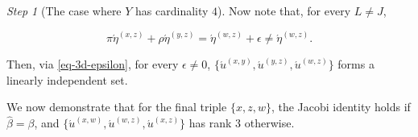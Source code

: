 \documentclass[ecta,nameyear,draft]{econsocart}
\newcommand{\xy}{{(x, y)}}
\newcommand{\yz}{{(y,z)}}
\newcommand{\xz}{{(x,z)}}
\newcommand{\xw}{{(x,w)}}
\newcommand{\wz}{(w,z)}
\theoremstyle{plain}
\theoremstyle{remark}
\newtheorem{step}{Step}[section]
\begin{document}
\begin{appendix}
\begin{step}[The case where $Y$ has cardinality $4$]
    Now note that, for every $L \neq J$,
    \begin{linenomath*}
      \begin{equation}\label{eq-3d-epsilon}
        \pi \acute{\eta}^{\xz} + \rho \acute{\eta}^{\yz} = \acute{\eta}^{\wz} +
        \epsilon \neq \acute{\eta}^{\wz}.
      \end{equation}
    \end{linenomath*}
    Then, via \eqref{eq-3d-epsilon}, for every $\epsilon\neq 0$,
    $\{\acute{u}^{\xy}, \acute{u}^{\yz}, \acute{u}^{\wz}\}$ forms a linearly
    independent set.

    We now demonstrate that for the final triple $\{x,z,w\}$, the Jacobi identity
    holds if $\hat{\beta} = \beta$, and
    $\{\acute{u}^{\xw},\acute{u}^{\wz},\acute{u}^{\xz}\}$ has rank $3$ otherwise.


\end{step}
\end{appendix}
\end{document}
